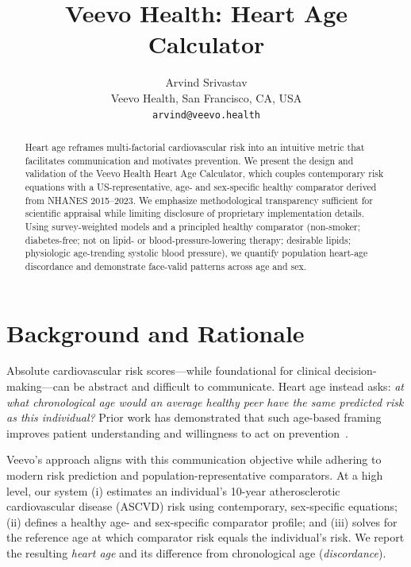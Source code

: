 \documentclass{article}
\title{Veevo Health: Heart Age Calculator}
\author{Arvind Srivastav \\
Veevo Health, San Francisco, CA, USA \\
\texttt{arvind@veevo.health}}
\begin{document}
\maketitle

\begin{abstract}
Heart age reframes multi-factorial cardiovascular risk into an intuitive metric that facilitates communication and motivates prevention. We present the design and validation of the Veevo Health Heart Age Calculator, which couples contemporary risk equations with a US-representative, age- and sex-specific healthy comparator derived from NHANES 2015--2023. We emphasize methodological transparency sufficient for scientific appraisal while limiting disclosure of proprietary implementation details. Using survey-weighted models and a principled healthy comparator (non-smoker; diabetes-free; not on lipid- or blood-pressure-lowering therapy; desirable lipids; physiologic age-trending systolic blood pressure), we quantify population heart-age discordance and demonstrate face-valid patterns across age and sex.
\end{abstract}


\section{Background and Rationale}
Absolute cardiovascular risk scores---while foundational for clinical decision-making---can be abstract and difficult to communicate. Heart age instead asks: \emph{at what chronological age would an average healthy peer have the same predicted risk as this individual?} Prior work has demonstrated that such age-based framing improves patient understanding and willingness to act on prevention~\cite{Blaha2021JAHA}.

Veevo's approach aligns with this communication objective while adhering to modern risk prediction and population-representative comparators. At a high level, our system (i) estimates an individual's 10-year atherosclerotic cardiovascular disease (ASCVD) risk using contemporary, sex-specific equations; (ii) defines a healthy age- and sex-specific comparator profile; and (iii) solves for the reference age at which comparator risk equals the individual's risk. We report the resulting \emph{heart age} and its difference from chronological age (\emph{discordance}).
\end{document}
